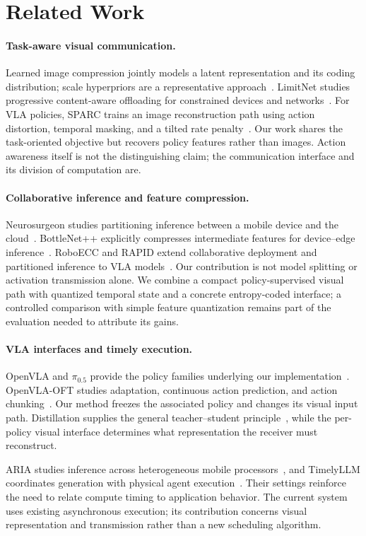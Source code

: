 \section{Related Work}
\label{sec:related}
\paragraph{Task-aware visual communication.}
Learned image compression jointly models a latent representation and its
coding distribution; scale hyperpriors are a representative
approach~\cite{hyperprior}. LimitNet studies progressive content-aware
offloading for constrained devices and networks~\cite{limitnet}.
For VLA policies, SPARC trains an image reconstruction path using action
distortion, temporal masking, and a tilted rate penalty~\cite{sparc}.
Our work shares the task-oriented objective but recovers policy features
rather than images. Action awareness itself is not the distinguishing
claim; the communication interface and its division of computation are.

\paragraph{Collaborative inference and feature compression.}
Neurosurgeon studies partitioning inference between a mobile device and
the cloud~\cite{neurosurgeon}. BottleNet++ explicitly compresses
intermediate features for device--edge inference~\cite{bottlenetpp}.
RoboECC and RAPID extend collaborative deployment and partitioned
inference to VLA models~\cite{roboecc,rapid}. Our contribution is not
model splitting or activation transmission alone. We combine a compact policy-supervised visual path
with quantized temporal state and a concrete entropy-coded interface;
a controlled comparison with simple feature quantization remains part
of the evaluation needed to attribute its gains.

\paragraph{VLA interfaces and timely execution.}
OpenVLA and $\pi_{0.5}$ provide the policy families underlying our
implementation~\cite{openvla,pi05}. OpenVLA-OFT studies adaptation,
continuous action prediction, and action chunking~\cite{openvlaoft}.
Our method freezes the associated policy and changes its visual
input path. Distillation supplies the general teacher--student
principle~\cite{distillation}, while the per-policy visual interface
determines what representation the receiver must reconstruct.

ARIA studies inference across heterogeneous mobile
processors~\cite{aria}, and TimelyLLM coordinates generation with
physical agent execution~\cite{timelyllm}. Their settings reinforce
the need to relate compute timing to application behavior. The current
system uses existing asynchronous execution; its contribution concerns
visual representation and transmission rather than a new scheduling
algorithm.
